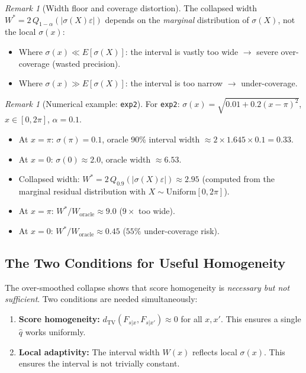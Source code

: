 \documentclass[11pt]{article}
\theoremstyle{remark}
\newtheorem{remark}[theorem]{Remark}
\begin{document}
\begin{remark}[Width floor and coverage distortion]
\label{rem:width-distortion}
The collapsed width
$W^* = 2\,Q_{1-\alpha}(|\sigma(X)\varepsilon|)$ depends on the
\emph{marginal} distribution of $\sigma(X)$, not the local
$\sigma(x)$:
\begin{itemize}
  \item Where $\sigma(x) \ll E[\sigma(X)]$: the interval is vastly
    too wide $\to$ severe over-coverage (wasted precision).
  \item Where $\sigma(x) \gg E[\sigma(X)]$: the interval is too narrow
    $\to$ under-coverage.
\end{itemize}
\end{remark}

\begin{remark}[Numerical example: \texttt{exp2}]
\label{rem:exp2-collapse}
For \texttt{exp2}: $\sigma(x) = \sqrt{0.01 + 0.2(x-\pi)^2}$,
$x \in [0, 2\pi]$, $\alpha = 0.1$.
\begin{itemize}
  \item At $x = \pi$: $\sigma(\pi) = 0.1$, oracle 90\% interval width
    $\approx 2 \times 1.645 \times 0.1 = 0.33$.
  \item At $x = 0$: $\sigma(0) \approx 2.0$, oracle width
    $\approx 6.53$.
  \item Collapsed width:
    $W^* = 2\,Q_{0.9}(|\sigma(X)\varepsilon|) \approx 2.95$ (computed
    from the marginal residual distribution with $X \sim \mathrm{Uniform}[0,2\pi]$).
  \item At $x = \pi$: $W^*/W_{\mathrm{oracle}} \approx 9.0$
    ($9\times$ too wide).
  \item At $x = 0$: $W^*/W_{\mathrm{oracle}} \approx 0.45$
    ($55\%$ under-coverage risk).
\end{itemize}
\end{remark}

\subsection{The Two Conditions for Useful Homogeneity}
\label{sec:two-conditions}

The over-smoothed collapse shows that score homogeneity is
\emph{necessary but not sufficient}. Two conditions are needed
simultaneously:

\begin{enumerate}
  \item \textbf{Score homogeneity:}
    $d_{\mathrm{TV}}(F_{s|x}, F_{s|x'}) \approx 0$ for all $x, x'$.
    This ensures a single $\hat{q}$ works uniformly.
  \item \textbf{Local adaptivity:}
    The interval width $W(x)$ reflects local $\sigma(x)$.
    This ensures the interval is not trivially constant.
\end{enumerate}
\end{document}
